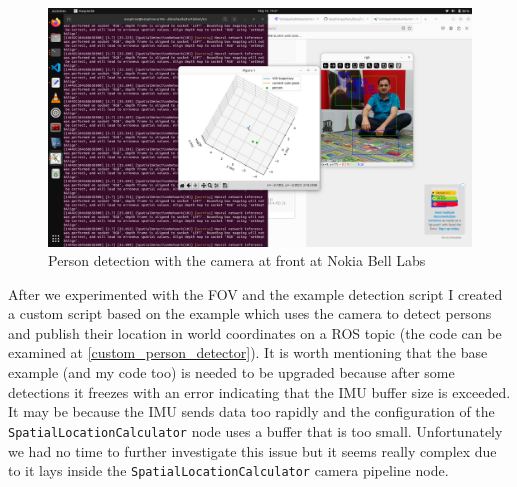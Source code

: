 \begin{figure}[htbp]
    \centering
    \includegraphics[width=150mm, keepaspectratio]{figures/person_detection_camera_at_front_nokia.png}
    \caption{Person detection with the camera at front at Nokia Bell Labs}
    \label{fig:person_detection_camera_at_front_nokia}
\end{figure}

After we experimented with the FOV and the example detection script I created a custom script based on the example which uses the camera to detect persons and publish their location in world coordinates on a ROS topic (the code can be examined at \ref{custom_person_detector}). It is worth mentioning that the base example (and my code too) is needed to be upgraded because after some detections it freezes with an error indicating that the IMU buffer size is exceeded. It may be because the IMU sends data too rapidly and the configuration of the \verb|SpatialLocationCalculator| node uses a buffer that is too small. Unfortunately we had no time to further investigate this issue but it seems really complex due to it lays inside the \verb|SpatialLocationCalculator| camera pipeline node.

